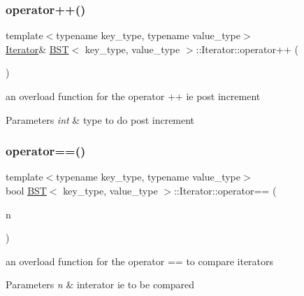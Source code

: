 \subsubsection{\texorpdfstring{operator++()}{operator++()}}
{\footnotesize\ttfamily template$<$typename key\+\_\+type, typename value\+\_\+type$>$ \\
\mbox{\hyperlink{class_b_s_t_1_1_iterator}{Iterator}}\& \mbox{\hyperlink{class_b_s_t}{B\+ST}}$<$ key\+\_\+type, value\+\_\+type $>$\+::Iterator\+::operator++ (\begin{DoxyParamCaption}\item[{int}]{ }\end{DoxyParamCaption})\hspace{0.3cm}{\ttfamily [inline]}}

an overload function for the operator ++ ie post increment 
\begin{DoxyParams}{Parameters}
{\em int} & type to do post increment \\
\hline
\end{DoxyParams}
\mbox{\label{class_b_s_t_1_1_iterator_ae77a4cfb591f0fcce064dc48efe55c31}} 
\subsubsection{\texorpdfstring{operator==()}{operator==()}}
{\footnotesize\ttfamily template$<$typename key\+\_\+type, typename value\+\_\+type$>$ \\
bool \mbox{\hyperlink{class_b_s_t}{B\+ST}}$<$ key\+\_\+type, value\+\_\+type $>$\+::Iterator\+::operator== (\begin{DoxyParamCaption}\item[{const \mbox{\hyperlink{class_b_s_t_1_1_iterator}{Iterator}} \&}]{n }\end{DoxyParamCaption})\hspace{0.3cm}{\ttfamily [inline]}}

an overload function for the operator == to compare iterators 
\begin{DoxyParams}{Parameters}
{\em n} & interator ie to be compared \\
\hline
\end{DoxyParams}
\mbox{\label{class_b_s_t_1_1_iterator_abcfd0f8dcfb0a3c7d2462208e682c7c1}} 
